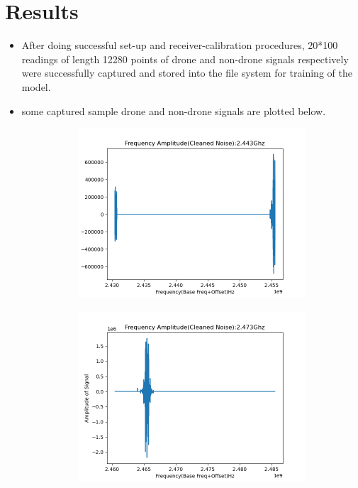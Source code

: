 \chapter{Results } \label{Results}

\begin{itemize}
  \item After doing successful set-up and receiver-calibration procedures, 20*100 readings of length 12280 points of drone and non-drone signals respectively were successfully captured and stored into the file system for training of the model.
    \item some captured sample drone and non-drone signals are plotted below.
    \begin{figure}[H]
      \label{drone}
      \begin{subfigure}{0.5\textwidth}
        \includegraphics[width=0.9\linewidth ]{images/drone_2.413Ghz-FA-4.00.png}
        \label{fig:subim1.1}
      \end{subfigure}
      \begin{subfigure}{0.5\textwidth}
        \includegraphics[width=0.9\linewidth]{images/drone_2.413Ghz-FA-8.00.png}
        \label{fig:subim2.1}
      \end{subfigure}


\end{figure}
\end{itemize}
